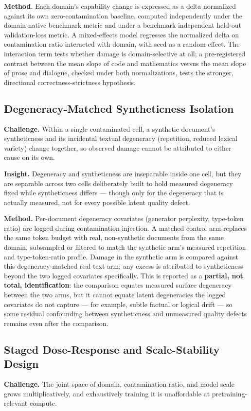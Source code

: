 \documentclass[11pt]{article}
\begin{document}
\textbf{Method.} Each domain's capability change is expressed as a delta normalized against its own zero-contamination baseline, computed independently under the domain-native benchmark metric and under a benchmark-independent held-out validation-loss metric. A mixed-effects model regresses the normalized delta on contamination ratio interacted with domain, with seed as a random effect. The interaction term tests whether damage is domain-selective at all; a pre-registered contrast between the mean slope of code and mathematics versus the mean slope of prose and dialogue, checked under both normalizations, tests the stronger, directional correctness-strictness hypothesis.

\subsection{Degeneracy-Matched Syntheticness Isolation}
\textbf{Challenge.} Within a single contaminated cell, a synthetic document's syntheticness and its incidental textual degeneracy (repetition, reduced lexical variety) change together, so observed damage cannot be attributed to either cause on its own.

\textbf{Insight.} Degeneracy and syntheticness are inseparable inside one cell, but they are separable across two cells deliberately built to hold measured degeneracy fixed while syntheticness differs --- though only for the degeneracy that is actually measured, not for every possible latent quality defect.

\textbf{Method.} Per-document degeneracy covariates (generator perplexity, type-token ratio) are logged during contamination injection. A matched control arm replaces the same token budget with real, non-synthetic documents from the same domain, subsampled or filtered to match the synthetic arm's measured repetition and type-token-ratio profile. Damage in the synthetic arm is compared against this degeneracy-matched real-text arm; any excess is attributed to syntheticness beyond the two logged covariates specifically. This is reported as a \textbf{partial, not total, identification}: the comparison equates measured surface degeneracy between the two arms, but it cannot equate latent degeneracies the logged covariates do not capture --- for example, subtle factual or logical drift --- so some residual confounding between syntheticness and unmeasured quality defects remains even after the comparison.

\subsection{Staged Dose-Response and Scale-Stability Design}
\textbf{Challenge.} The joint space of domain, contamination ratio, and model scale grows multiplicatively, and exhaustively training it is unaffordable at pretraining-relevant compute.
\end{document}
